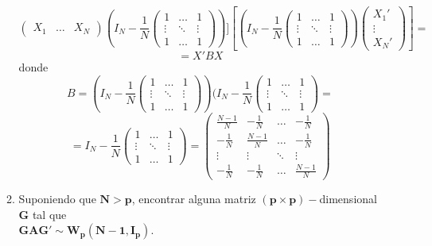 \documentclass[11pt,a4paper]{article}
\begin{document}
\begin{enumerate}[label=\arabic*.]
\begin{enumerate}[label=(\alph*)]
$$\begin{pmatrix}
X_{1} & \dots & X_{N}
\end{pmatrix} (I_{N} - \frac{1}{N} \begin{pmatrix}
1 & \dots & 1 \\
\vdots & \ddots & \vdots \\
1 & \dots & 1
\end{pmatrix})][(I_{N} - \frac{1}{N} \begin{pmatrix}
1 & \dots & 1 \\
\vdots & \ddots & \vdots \\
1 & \dots & 1
\end{pmatrix}) \begin{pmatrix}
X_{1}' \\ \vdots \\ X_{N}'
\end{pmatrix}] =$$
$$= X' B X$$
donde
$$B = (I_{N} - \frac{1}{N} \begin{pmatrix}
1 & \dots & 1 \\
\vdots & \ddots & \vdots \\
1 & \dots & 1
\end{pmatrix}) (I_{N} - \frac{1}{N} \begin{pmatrix}
1 & \dots & 1 \\
\vdots & \ddots & \vdots \\
1 & \dots & 1
\end{pmatrix} =$$
$$= I_{N} - \frac{1}{N} \begin{pmatrix}
1 & \dots & 1 \\
\vdots & \ddots & \vdots \\
1 & \dots & 1
\end{pmatrix} = \begin{pmatrix}
\frac{N-1}{N} & -\frac{1}{N} & \dots & -\frac{1}{N} \\
-\frac{1}{N} & \frac{N-1}{N} & \dots & -\frac{1}{N} \\
\vdots & \vdots & \ddots & \vdots \\
-\frac{1}{N} & - \frac{1}{N} & \dots & \frac{N-1}{N}
\end{pmatrix}$$

\vspace{1cm}
\bfseries
\item Suponiendo que $\mathbf{N > p}$, encontrar alguna matriz $\mathbf{(p \times p)-}$dimensional $\mathbf{G}$ tal que \\ $\mathbf{GAG' \sim W_{p}(N-1,I_{p})}$.

\vspace{0.5cm}
\normalfont


\end{enumerate}
\end{enumerate}
\end{document}

